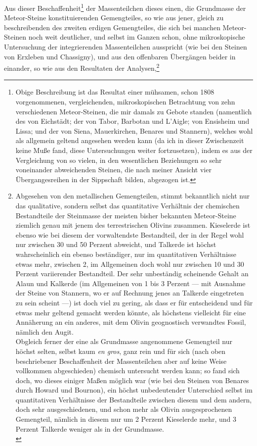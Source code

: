 \documentclass[a4paper, 11pt, oneside, german]{article}
\begin{document}
Aus dieser Beschaffenheit\footnote{Obige Beschreibung ist das Resultat einer mühsamen, schon 1808 vorgenommenen, vergleichenden, mikroskopischen Betrachtung von zehn verschiedenen Meteor-Steinen, die mir damals zu Gebote standen (namentlich des von Eichstädt; der von Tabor, Barbotan und L'Aigle; von Ensisheim und Lissa; und der von Siena, Mauerkirchen, Benares und Stannern), welches wohl als allgemein geltend angesehen werden kann (da ich in dieser Zwischenzeit keine Muße fand, diese Untersuchungen weiter fortzusetzen), indem es aus der Vergleichung von so vielen, in den wesentlichen Beziehungen so sehr voneinander abweichenden Steinen, die nach meiner Ansicht vier Übergangesreihen in der Sippschaft bilden, abgezogen ist.} der Massenteilchen dieses einen, die Grundmasse der Meteor-Steine konstituierenden Gemengteiles, so wie aus jener, gleich zu beschreibenden des zweiten erdigen Gemengteiles, die sich bei manchen Meteor-Steinen noch weit deutlicher, und selbst im Ganzen schon, ohne mikroskopische Untersuchung der integrierenden Massenteilchen ausspricht (wie bei den Steinen von Erxleben und Chassigny), und aus den offenbaren Übergängen beider in einander, so wie aus den Resultaten der Analysen,\footnote{Abgesehen von den metallischen Gemengteilen, stimmt bekanntlich nicht nur das qualitative, sondern selbst das quantitative Verhältnis der chemischen Bestandteile der Steinmasse der meisten bisher bekannten Meteor-Steine ziemlich genau mit jenem des terrestrischen Olivins zusammen. Kieselerde ist ebenso wie bei diesem der vorwaltendste Bestandteil, der in der Regel wohl nur zwischen 30 und 50 Perzent abweicht, und Talkerde ist höchst wahrscheinlich ein ebenso beständiger, nur im quantitativen Verhältnisse etwas mehr, zwischen 2, im Allgemeinen doch wohl nur zwischen 10 und 30 Perzent variierender Bestandteil. Der sehr unbeständig scheinende Gehalt an Alaun und Kalkerde (im Allgemeinen von 1 bis 3 Perzent --- mit Ausnahme der Steine von Stannern, wo er auf Rechnung jenes an Talkerde eingetreten zu sein scheint ---) ist doch viel zu gering, als dass er für entscheidend und für etwas mehr geltend gemacht werden könnte, als höchstens vielleicht für eine Annäherung an ein anderes, mit dem Olivin geognostisch verwandtes Fossil, nämlich den Augit.\\
Obgleich ferner der eine als Grundmasse angenommene Gemengteil nur höchst selten, selbst kaum \emph{en gros}, ganz rein und für sich (nach oben beschriebener Beschaffenheit der Massenteilchen aber auf keine Weise vollkommen abgeschieden) chemisch untersucht werden kann; so fand sich doch, wo dieses einiger Maßen möglich war (wie bei den Steinen von Benares durch Howard und Bournon), ein höchst unbedeutender Unterschied selbst im quantitativen Verhältnisse der Bestandteile zwischen diesem und dem andern, doch sehr ausgeschiedenen, und schon mehr als Olivin ausgesprochenen Gemengteil, nämlich in diesem nur um 2 Perzent Kieselerde mehr, und 3 Perzent Talkerde weniger als in der Grundmasse.\\
}
\end{document}
